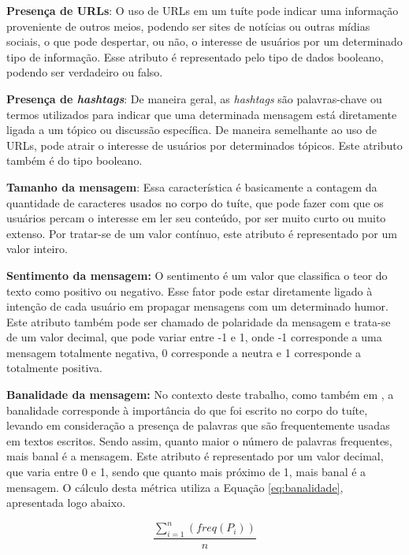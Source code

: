\documentclass[oneside,openright,12pt]{ufsm_2015} %
\begin{document}
    \par \textbf{Presença de URLs}: O uso de URLs em um tuíte pode indicar uma informação proveniente de outros meios, podendo ser sites de notícias ou outras mídias sociais, o que pode despertar, ou não, o interesse de usuários por um determinado tipo de informação. Esse atributo é representado pelo tipo de dados booleano, podendo ser verdadeiro ou falso.

    \par \textbf{Presença de \textit{hashtags}}: De maneira geral, as \textit{hashtags} são palavras-chave ou termos utilizados para indicar que uma determinada mensagem está diretamente ligada a um tópico ou discussão específica. De maneira semelhante ao uso de URLs, pode atrair o interesse de usuários por determinados tópicos. Este atributo também é do tipo booleano.

    \par \textbf{Tamanho da mensagem}: Essa característica é basicamente a contagem da quantidade de caracteres usados no corpo do tuíte, que pode fazer com que os usuários percam o interesse em ler seu conteúdo, por ser muito curto ou muito extenso. Por tratar-se de um valor contínuo, este atributo é representado por um valor inteiro.

    \par \textbf{Sentimento da mensagem:} O sentimento é um valor que classifica o teor do texto como positivo ou negativo. Esse fator pode estar diretamente ligado à intenção de cada usuário em propagar mensagens com um determinado humor. Este atributo também pode ser chamado de polaridade da mensagem e trata-se de um valor decimal, que pode variar entre -1 e 1, onde -1 corresponde a uma mensagem totalmente negativa, 0 corresponde a neutra e 1 corresponde a totalmente positiva.

    \par \textbf{Banalidade da mensagem:} No contexto deste trabalho, como também em \cite{artigo:oliveira:18}, a banalidade corresponde à importância do que foi escrito no corpo do tuíte, levando em consideração a presença de palavras que são frequentemente usadas em textos escritos. Sendo assim, quanto maior o número de palavras frequentes, mais banal é a mensagem. Este atributo é representado por um valor decimal, que varia entre 0 e 1, sendo que quanto mais próximo de 1, mais banal é a mensagem. O cálculo desta métrica utiliza a Equação \ref{eq:banalidade}, apresentada logo abaixo.

    \begin{equation} \label{eq:banalidade}
    \frac{\sum_{i=1}^n (freq(P_i))}{n}
    \end{equation}
    
\end{document}
